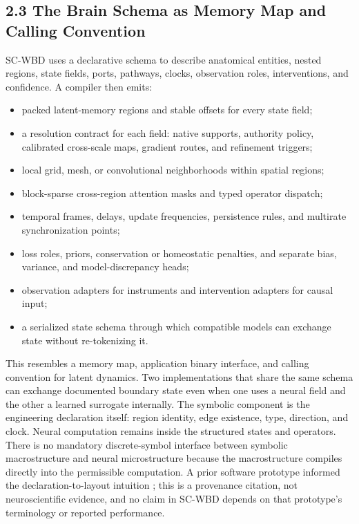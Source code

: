 \subsection{2.3 The Brain Schema as Memory Map and Calling Convention}

SC-WBD uses a declarative schema to describe anatomical entities, nested
regions, state fields, ports, pathways, clocks, observation roles,
interventions, and confidence. A compiler then emits:

\begin{itemize}
\item packed latent-memory regions and stable offsets for every state field;
\item a resolution contract for each field: native supports, authority policy,
  calibrated cross-scale maps, gradient routes, and refinement triggers;
\item local grid, mesh, or convolutional neighborhoods within spatial
  regions;
\item block-sparse cross-region attention masks and typed operator dispatch;
\item temporal frames, delays, update frequencies, persistence rules, and
  multirate synchronization points;
\item loss roles, priors, conservation or homeostatic penalties, and
  separate bias, variance, and model-discrepancy heads;
\item observation adapters for instruments and intervention adapters for
  causal input;
\item a serialized state schema through which compatible models can exchange
  state without re-tokenizing it.
\end{itemize}

This resembles a memory map, application binary interface, and calling
convention for latent dynamics. Two implementations that share the same
schema can exchange documented boundary state even when one uses a neural
field and the other a learned surrogate internally. The symbolic component is
the engineering declaration itself: region identity, edge existence, type,
direction, and clock. Neural computation remains inside the structured states
and operators. There is no mandatory discrete-symbol interface between
symbolic macrostructure and neural microstructure because the macrostructure
compiles directly into the permissible computation. A prior software prototype
informed the declaration-to-layout intuition \citep{valdezcanvas2026}; this is
a provenance citation, not neuroscientific evidence, and no claim in SC-WBD
depends on that prototype's terminology or reported performance.

